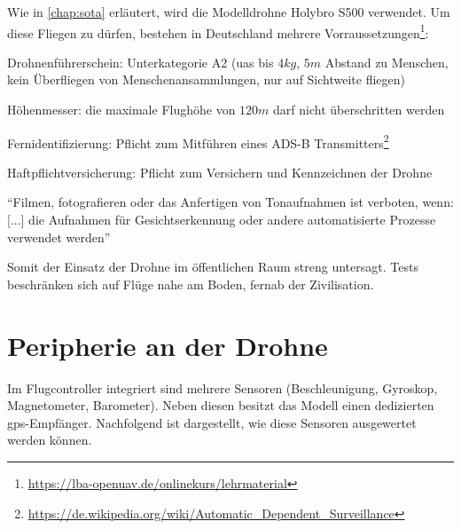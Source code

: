 Wie in \cref{chap:sota} erläutert, wird die Modelldrohne Holybro S500 verwendet. Um diese Fliegen zu dürfen, bestehen in Deutschland mehrere Vorraussetzungen\footnote{\url{https://lba-openuav.de/onlinekurs/lehrmaterial}}:
\begin{compactitem}
	\item Drohnenführerschein: Unterkategorie A2 (\gls{uas} bis $4kg$, $5m$ Abstand zu Menschen, kein Überfliegen von Menschenansammlungen, nur auf Sichtweite fliegen)
	\item Höhenmesser: die maximale Flughöhe von $120m$ darf nicht überschritten werden
	\item Fernidentifizierung: Pflicht zum Mitführen eines ADS-B Transmitters\footnote{\url{https://de.wikipedia.org/wiki/Automatic_Dependent_Surveillance}} 
	\item Haftpflichtversicherung: Pflicht zum Versichern und Kennzeichnen der Drohne
	\item \enquote{Filmen, fotografieren oder das Anfertigen von Tonaufnahmen ist verboten, wenn: [...] die Aufnahmen für Gesichtserkennung oder andere automatisierte Prozesse verwendet werden}
\end{compactitem}

Somit der Einsatz der Drohne im öffentlichen Raum streng untersagt. Tests beschränken sich auf Flüge nahe am Boden, fernab der Zivilisation.

\section{Peripherie an der Drohne}
Im Flugcontroller integriert sind mehrere Sensoren (Beschleunigung, Gyroskop, Magnetometer, Barometer). Neben diesen besitzt das Modell einen dedizierten \gls{gps}-Empfänger. Nachfolgend ist dargestellt, wie diese Sensoren ausgewertet werden können.

